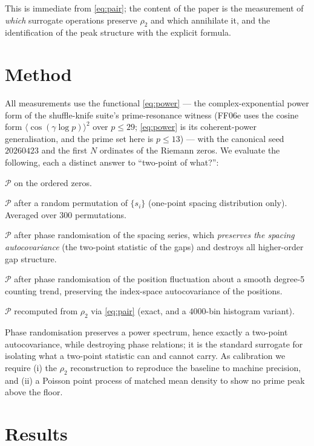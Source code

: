 \documentclass[11pt]{article}
\begin{document}
\noindent This is immediate from \eqref{eq:pair}; the content of the paper is the measurement of \emph{which} surrogate operations preserve $\rho_2$ and which annihilate it, and the identification of the peak structure with the explicit formula.

\section{Method}\label{sec:method}

All measurements use the functional \eqref{eq:power} --- the complex-exponential power form of the shuffle-knife suite's prime-resonance witness (FF06e uses the cosine form $\langle\cos(\gamma\log p)\rangle^2$ over $p \le 29$; \eqref{eq:power} is its coherent-power generalisation, and the prime set here is $p \le 13$) --- with the canonical seed $20260423$ and the first $N$ ordinates of the Riemann zeros. We evaluate the following, each a distinct answer to ``two-point of what?'':
\begin{description}[leftmargin=1.6em,itemsep=2pt]
  \item[Baseline.] $\mathcal P$ on the ordered zeros.
  \item[Spacing floor.] $\mathcal P$ after a random permutation of $\{s_i\}$ (one-point spacing distribution only). Averaged over $300$ permutations.
  \item[Gap two-point (C).] $\mathcal P$ after phase randomisation of the spacing series, which \emph{preserves the spacing autocovariance} (the two-point statistic of the gaps) and destroys all higher-order gap structure.
  \item[Index two-point (D).] $\mathcal P$ after phase randomisation of the position fluctuation about a smooth degree-5 counting trend, preserving the index-space autocovariance of the positions.
  \item[Value-space pair correlation (E).] $\mathcal P$ recomputed from $\rho_2$ via \eqref{eq:pair} (exact, and a $4000$-bin histogram variant).
\end{description}
Phase randomisation preserves a power spectrum, hence exactly a two-point autocovariance, while destroying phase relations; it is the standard surrogate for isolating what a two-point statistic can and cannot carry. As calibration we require (i) the $\rho_2$ reconstruction to reproduce the baseline to machine precision, and (ii) a Poisson point process of matched mean density to show no prime peak above the floor.

\section{Results}\label{sec:results}
\end{document}

